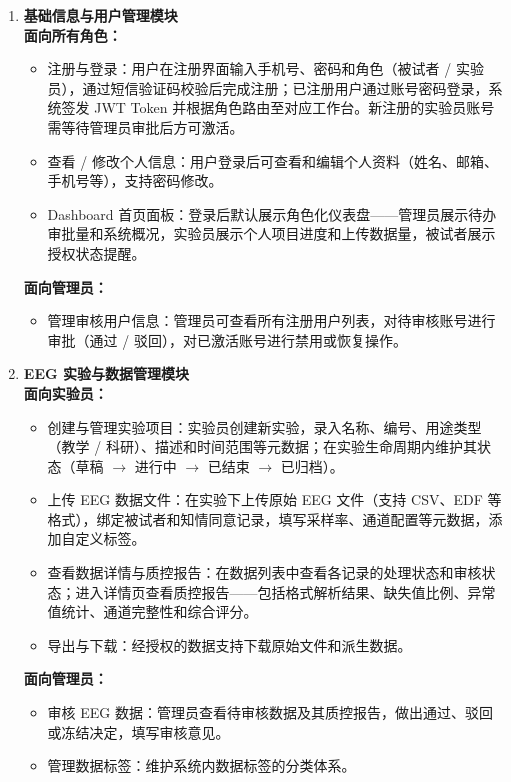 \begin{enumerate}[(1)]
  \item \textbf{基础信息与用户管理模块}\\
    \textbf{面向所有角色：}
    \begin{itemize}
      \item 注册与登录：用户在注册界面输入手机号、密码和角色（被试者 / 实验员），通过短信验证码校验后完成注册；已注册用户通过账号密码登录，系统签发 JWT Token 并根据角色路由至对应工作台。新注册的实验员账号需等待管理员审批后方可激活。
      \item 查看 / 修改个人信息：用户登录后可查看和编辑个人资料（姓名、邮箱、手机号等），支持密码修改。
      \item Dashboard 首页面板：登录后默认展示角色化仪表盘——管理员展示待办审批量和系统概况，实验员展示个人项目进度和上传数据量，被试者展示授权状态提醒。
    \end{itemize}
    \textbf{面向管理员：}
    \begin{itemize}
      \item 管理审核用户信息：管理员可查看所有注册用户列表，对待审核账号进行审批（通过 / 驳回），对已激活账号进行禁用或恢复操作。
    \end{itemize}

  \item \textbf{EEG 实验与数据管理模块}\\
    \textbf{面向实验员：}
    \begin{itemize}
      \item 创建与管理实验项目：实验员创建新实验，录入名称、编号、用途类型（教学 / 科研）、描述和时间范围等元数据；在实验生命周期内维护其状态（草稿 $\to$ 进行中 $\to$ 已结束 $\to$ 已归档）。
      \item 上传 EEG 数据文件：在实验下上传原始 EEG 文件（支持 CSV、EDF 等格式），绑定被试者和知情同意记录，填写采样率、通道配置等元数据，添加自定义标签。
      \item 查看数据详情与质控报告：在数据列表中查看各记录的处理状态和审核状态；进入详情页查看质控报告——包括格式解析结果、缺失值比例、异常值统计、通道完整性和综合评分。
      \item 导出与下载：经授权的数据支持下载原始文件和派生数据。
    \end{itemize}
    \textbf{面向管理员：}
    \begin{itemize}
      \item 审核 EEG 数据：管理员查看待审核数据及其质控报告，做出通过、驳回或冻结决定，填写审核意见。
      \item 管理数据标签：维护系统内数据标签的分类体系。
    \end{itemize}


\end{enumerate}
